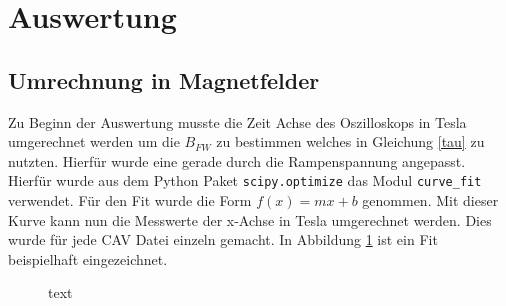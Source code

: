 \section{Auswertung}
\subsection{Umrechnung in Magnetfelder}
Zu Beginn der Auswertung musste die Zeit Achse des Oszilloskops in Tesla umgerechnet werden um die $B_{FW}$ zu bestimmen welches in Gleichung \ref{tau} zu nutzten. Hierfür wurde eine gerade durch die Rampenspannung angepasst. Hierfür wurde aus dem Python Paket \verb|scipy.optimize| das Modul \verb|curve_fit| verwendet. Für den Fit wurde die Form $f(x)=mx+b$ genommen. Mit dieser Kurve kann nun die Messwerte der x-Achse in Tesla umgerechnet werden. Dies wurde für jede CAV Datei einzeln gemacht. In Abbildung \ref{MagnetfeldAbbildung} ist ein Fit beispielhaft eingezeichnet.\par
\begin{figure}[ht]
	\centering
	\caption{text}
	\label{MagnetfeldAbbildung}
\end{figure}
